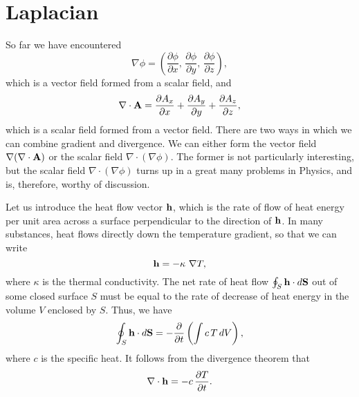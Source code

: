 \section{Laplacian}
So far we have encountered
\begin{equation}
\nabla\phi = \left(\frac{\partial \phi}{\partial x},\, \frac{\partial \phi}
{\partial y},\, \frac{\partial \phi}{\partial z}\right),
\end{equation}
which is a vector field formed from a scalar field, and 
\begin{equation}
\nabla\cdot{\bf A} = \frac{\partial A_x}{\partial x} + 
\frac{\partial A_y}{\partial y}  +\frac{\partial A_z}{\partial z},
\end{equation}
which is a scalar field formed from a vector field. There are two ways in which
we can combine gradient and divergence. We can either form the vector field 
$\nabla(\nabla\cdot{\bf A})$ or  the scalar field $\nabla\cdot(\nabla\phi)$.
The former is not particularly interesting, but the scalar field 
$\nabla\cdot(\nabla\phi)$ turns up in a great many problems in Physics, and is, 
therefore, worthy of discussion. 

Let us introduce the heat flow vector ${\bf h}$, which is the rate of flow of heat
energy per unit area across a surface perpendicular to the direction of ${\bf h}$.
In many substances, heat flows directly down the temperature gradient, so that we
can write
\begin{equation}\label{e2127}
{\bf h} = - \kappa \,\,\nabla T,
\end{equation}
where $\kappa$ is the thermal conductivity. The net rate of heat flow 
$\oint_S {\bf h}\cdot d{\bf S}$ out of some closed surface $S$ must be equal
to the rate of decrease of heat energy in the volume $V$ enclosed by $S$.
Thus, we have
\begin{equation}
\oint_S {\bf h}\cdot d{\bf S} = - \frac{\partial}{\partial t}\left(
\int c\, T\,dV\right),
\end{equation}
where $c$ is the specific heat. It follows from the divergence theorem that
\begin{equation}\label{e2129}
\nabla\cdot{\bf h} = -c\,\frac{\partial T}{\partial t}.
\end{equation}

